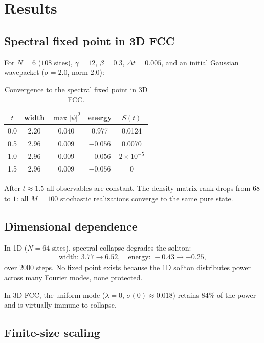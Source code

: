 \documentclass[twocolumn]{article}
\begin{document}
\section{Results}

\subsection{Spectral fixed point in 3D FCC}

For $N=6$ ($108$ sites), $\gamma=12$, $\beta=0.3$, $\Delta t=0.005$,
and an initial Gaussian wavepacket ($\sigma=2.0$, norm $2.0$):

\begin{table}[h]
  \centering
  \caption{Convergence to the spectral fixed point in 3D FCC.}
  \begin{tabular}{ccccc}
    $t$ & width & $\max|\psi|^2$ & energy & $S(t)$ \\
    \hline
    0.0 & 2.20 & 0.040 & 0.977 & 0.0124 \\
    0.5 & 2.96 & 0.009 & $-0.056$ & 0.0070 \\
    1.0 & 2.96 & 0.009 & $-0.056$ & $2\times10^{-5}$ \\
    1.5 & 2.96 & 0.009 & $-0.056$ & 0 \\
  \end{tabular}
\end{table}

After $t\approx1.5$ all observables are constant. The density matrix
rank drops from $68$ to $1$: all $M=100$ stochastic realizations
converge to the same pure state.

\subsection{Dimensional dependence}

In 1D ($N=64$ sites), spectral collapse degrades the soliton:
\begin{align}
  \text{width: }3.77\to6.52,\quad
  \text{energy: }-0.43\to-0.25,
\end{align}
over $2000$ steps. No fixed point exists because the 1D soliton
distributes power across many Fourier modes, none protected.

In 3D FCC, the uniform mode ($\lambda=0$, $\sigma(0)\approx0.018$)
retains $84\%$ of the power and is virtually immune to collapse.

\subsection{Finite-size scaling}
\end{document}
